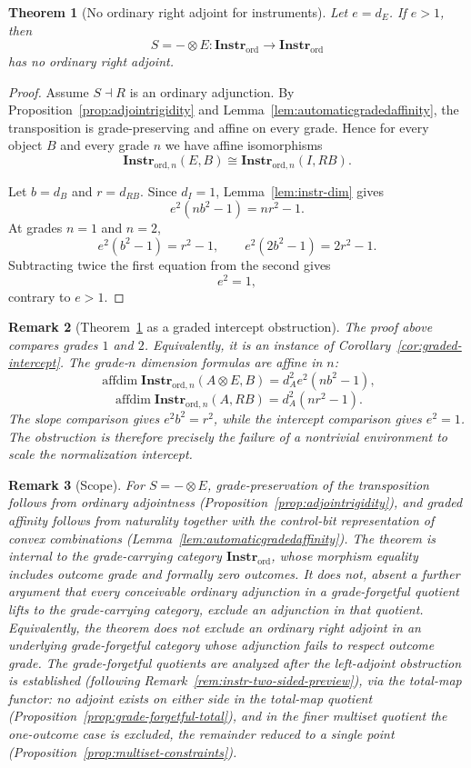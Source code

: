 \documentclass[11pt]{article}
\newtheorem{theorem}{Theorem}[section]
\newtheorem{remark}[theorem]{Remark}
\DeclareMathOperator{\affdim}{affdim}
\begin{document}
\begin{theorem}[No ordinary right adjoint for instruments]
\label{thm:instr-no-right}
Let $e=d_E$. If $e>1$, then
\[
S=-\otimes E:\mathbf{Instr}_{\mathrm{ord}}\to
\mathbf{Instr}_{\mathrm{ord}}
\]
has no ordinary right adjoint.
\end{theorem}

\begin{proof}
Assume $S\dashv R$ is an ordinary adjunction. By
Proposition~\ref{prop:adjointrigidity} and
Lemma~\ref{lem:automaticgradedaffinity}, the transposition is
grade-preserving and affine on every grade. Hence for every object $B$ and
every grade $n$ we have affine isomorphisms
\[
\mathbf{Instr}_{\mathrm{ord},n}(E,B)
\cong
\mathbf{Instr}_{\mathrm{ord},n}(I,RB).
\]

Let $b=d_B$ and $r=d_{RB}$. Since $d_I=1$, Lemma~\ref{lem:instr-dim}
gives
\[
e^2(nb^2-1)=nr^2-1.
\]
At grades $n=1$ and $n=2$,
\[
e^2(b^2-1)=r^2-1,
\qquad
e^2(2b^2-1)=2r^2-1.
\]
Subtracting twice the first equation from the second gives
\[
e^2=1,
\]
contrary to $e>1$.
\end{proof}

\begin{remark}[Theorem~\ref{thm:instr-no-right} as a graded intercept
obstruction]
\label{rem:instr-right-intercept}
The proof above compares grades $1$ and $2$. Equivalently, it is an
instance of Corollary~\ref{cor:graded-intercept}. The grade-$n$ dimension
formulas are affine in $n$:
\[
\affdim\mathbf{Instr}_{\mathrm{ord},n}(A\otimes E,B)
=
d_A^2e^2(nb^2-1),
\]
\[
\affdim\mathbf{Instr}_{\mathrm{ord},n}(A,RB)
=
d_A^2(nr^2-1).
\]
The slope comparison gives $e^2b^2=r^2$, while the intercept comparison
gives $e^2=1$. The obstruction is therefore precisely the failure of a
nontrivial environment to scale the normalization intercept.
\end{remark}

\begin{remark}[Scope]
\label{rem:instr-scope}
For $S=-\otimes E$, grade-preservation of the transposition follows from
ordinary adjointness (Proposition~\ref{prop:adjointrigidity}), and graded
affinity follows from naturality together with the control-bit
representation of convex combinations
(Lemma~\ref{lem:automaticgradedaffinity}). The theorem is internal to the
grade-carrying category $\mathbf{Instr}_{\mathrm{ord}}$, whose morphism
equality includes outcome grade and formally zero outcomes. It does not,
absent a further argument that every conceivable ordinary adjunction in a
grade-forgetful quotient lifts to the grade-carrying category, exclude an
adjunction in that quotient. Equivalently, the theorem does not exclude an
ordinary right adjoint in an underlying grade-forgetful category whose
adjunction fails to respect outcome grade. The grade-forgetful quotients are
analyzed after the left-adjoint obstruction is established (following
Remark~\ref{rem:instr-two-sided-preview}), via the total-map functor: no adjoint
exists on either side in the total-map quotient
(Proposition~\ref{prop:grade-forgetful-total}), and in the finer multiset
quotient the one-outcome case is excluded, the remainder reduced to a single
point (Proposition~\ref{prop:multiset-constraints}).
\end{remark}
\end{document}
